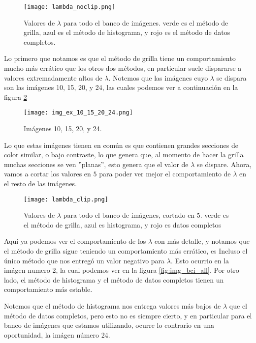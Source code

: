     \begin{figure}[H]
        \centering
        \texttt{[image: lambda\_noclip.png]}
        \caption{Valores de $\lambda$ para todo el banco de im\'agenes. verde es el m\'etodo de grilla, azul es el m\'etodo de histograma, y rojo es el m\'etodo de datos completos.}
        \label{fig:lambda_noclip}
    \end{figure}

    Lo primero que notamos es que el m\'etodo de grilla tiene un comportamiento mucho m\'as err\'atico que los otros dos m\'etodos, en particular suele dispararse a valores extremadamente altos de $\lambda$. Notemos que las im\'agenes cuyo $\lambda$ se dispara son las im\'agenes 10, 15, 20, y 24, las cuales podemos ver a continuaci\'on en la figura \ref{fig:img_bci_10_15_20}

    \begin{figure}[H]
        \centering
        \texttt{[image: img\_ex\_10\_15\_20\_24.png]}
        \caption{Im\'agenes 10, 15, 20, y 24.}
        \label{fig:img_bci_10_15_20}
    \end{figure}

    Lo que estas im\'agenes tienen en com\'un es que contienen grandes secciones de color similar, o bajo contraste, lo que genera que, al momento de hacer la grilla muchas secciones se ven ''planas'', esto genera que el valor de $\lambda$ se dispare. Ahora, vamos a cortar los valores en $5$ para poder ver mejor el comportamiento de $\lambda$ en el resto de las im\'agenes.

    \begin{figure}[H]
        \centering
        \texttt{[image: lambda\_clip.png]}
        \caption{Valores de $\lambda$ para todo el banco de im\'agenes, cortado en 5. verde es el m\'etodo de grilla, azul es histograma, y rojo es datos completos}
        \label{fig:lambda_clip}
    \end{figure}

    Aqu\'i ya podemos ver el comportamiento de los $\lambda$ con m\'as detalle, y notamos que el m\'etodo de grilla sigue teniendo un comportamiento m\'as err\'atico, es Incluso el \'unico m\'etodo que nos entreg\'o un valor negativo para $\lambda$. Esto ocurrio en la im\'agen numero 2, la cual podemos ver en la figura \ref{fig:img_bci_all}. Por otro lado, el m\'etodo de histograma y el m\'etodo de datos completos tienen un comportamiento m\'as estable. 
    
    Notemos que el m\'etodo de histograma nos entrega valores m\'as bajos de $\lambda$ que el m\'etodo de datos completos, pero esto no es siempre cierto, y en particular para el banco de im\'agenes que estamos utilizando, ocurre lo contrario en una oportunidad, la im\'agen n\'umero 24.

